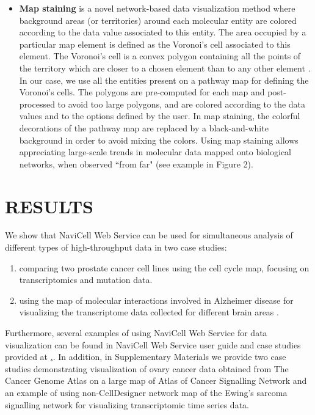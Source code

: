 \documentclass[a4,center,fleqn]{NAR}
\begin{document}
\begin{itemize}
\item \textbf{Map staining} is a novel network-based data visualization method where
background areas (or territories) around each molecular entity are colored according to the data
value associated to this entity. The area occupied by a particular map element is defined as the Voronoi's cell
associated to this element. The Voronoi's cell is a convex polygon containing all the points
of the territory which are closer to a chosen element than to any other element
\cite{aurenhammer1991voronoi}. In our case, we use all the entities present on a pathway map
for defining the Voronoi's cells. The polygons are pre-computed for each map and post-processed
to avoid too large polygons, and are colored according to the data values and to the options
defined by the user. In map staining, the colorful decorations of the pathway map
are replaced by a black-and-white background in order to avoid mixing the colors.
Using map staining allows appreciating large-scale trends in molecular data mapped
onto biological networks, when observed ``from far" (see example in Figure 2).

\end{itemize}



\section{RESULTS}

We show that NaviCell Web Service can be used for simultaneous analysis of
different types of high-throughput data in two case studies:
\begin{enumerate}
\item comparing two prostate cancer cell lines using the cell cycle map,
focusing on transcriptomics and mutation data.

\item using the map of molecular interactions involved in Alzheimer disease
\cite{Mizuno2012} for visualizing the transcriptome data collected for
different brain areas \cite{hokama2013altered}.
\end{enumerate}

Furthermore, several examples of using NaviCell Web Service for data
visualization can be found in NaviCell Web Service user guide and case studies
provided at \href{http://navicell.curie.fr/pages/nav\_web\_service.html}.. In addition, in Supplementary
Materials we provide two case studies demonstrating visualization of ovary cancer data obtained from The Cancer Genome
Atlas \cite{TCGA2011Ovarian} on a large map of Atlas of Cancer Signalling
Network \cite{Kuperstein2015} and an example of using non-CellDesigner network map
of the Ewing's sarcoma signalling network \cite{Stoll2013} for visualizing transcriptomic time series data.
\end{document}
